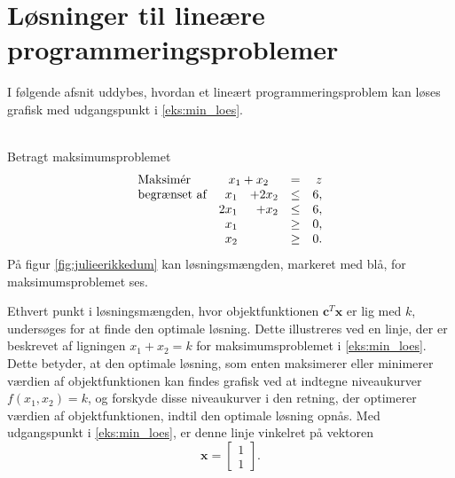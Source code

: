 \section{Løsninger til lineære programmeringsproblemer}
%
%
\label{heeeeejjulle}
%
%
I følgende afsnit uddybes, hvordan et lineært programmeringsproblem kan løses grafisk med udgangspunkt i \ref{eks:min_loes}.
\\\\
\begin{eks}
\label{eks:min_loes}
Betragt maksimumsproblemet
%
\begin{align*}
\begin{array}{lrrlr}
\text{Maksimér}		&	\multicolumn{2}{c}{x_1+x_2} &= &z\\
\text{begrænset af}	&x_1& + 2x_2			&\leq 	& 6,\\
					&2x_1& + x_2			&\leq	& 6,\\
					&x_1&    				&\geq	& 0,\\
					&x_2&    				&\geq	& 0.\\
\end{array}
\end{align*}
%
På figur \ref{fig:julieerikkedum} kan løsningsmængden, markeret med blå, for maksimumsproblemet ses. 
%

%
\end{eks}
%
%
%
Ethvert punkt i løsningsmængden, hvor objektfunktionen $\textbf{c}^T\textbf{x}$ er lig med $k$, undersøges for at finde den optimale løsning.
Dette illustreres ved en linje, der er beskrevet af ligningen $x_1+x_2=k$ for maksimumsproblemet i \ref{eks:min_loes}. 
Dette betyder, at den optimale løsning, som enten maksimerer eller minimerer værdien af objektfunktionen kan findes grafisk ved at indtegne niveaukurver $f(x_1, x_2)=k$, og forskyde disse niveaukurver i den retning, der optimerer værdien af objektfunktionen, indtil den optimale løsning opnås.  
Med udgangspunkt i \ref{eks:min_loes}, er denne linje vinkelret på vektoren 
%
$$
\textbf{x}=
\begin{bmatrix}
1\\1
\end{bmatrix}.
$$
